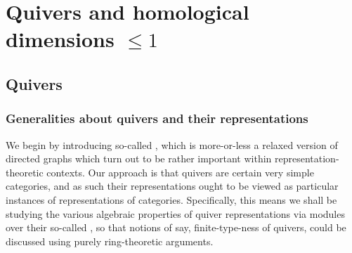 \section{Quivers and homological dimensions \texorpdfstring{$\leq 1$}{}}
    \subsection{Quivers}
        \subsubsection{Generalities about quivers and their representations}
            We begin by introducing so-called , which is more-or-less a relaxed version of directed graphs which turn out to be rather important within representation-theoretic contexts. Our approach is that quivers are certain very simple categories, and as such their representations ought to be viewed as particular instances of representations of categories. Specifically, this means we shall be studying the various algebraic properties of quiver representations via modules over their so-called , so that notions of say, finite-type-ness of quivers, could be discussed using purely ring-theoretic arguments.
        
